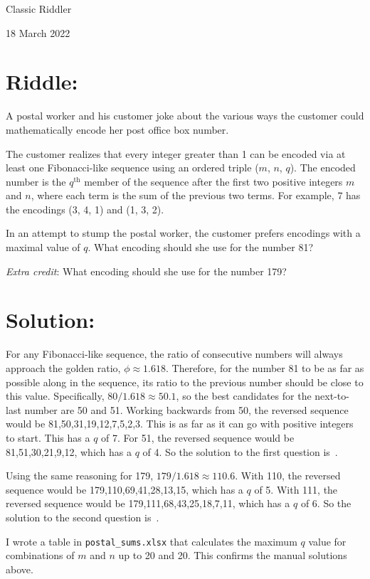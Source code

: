 \documentclass{article}
\begin{document}
\pagestyle{empty} %

\begin{center}
{\LARGE Classic Riddler}

\vspace{0.15in}

{\Large 18 March 2022}
\end{center}


\section*{Riddle:}

A postal worker and his customer joke about the various ways the customer could mathematically encode her post office box number.

The customer realizes that every integer greater than 1 can be encoded via at least one Fibonacci-like sequence using an ordered triple ($m$, $n$, $q$).
The encoded number is the $q^{\mathrm{th}}$ member of the sequence after the first two positive integers $m$ and $n$, where each term is the sum of the previous two terms.
For example, 7 has the encodings (3, 4, 1) and (1, 3, 2).

In an attempt to stump the postal worker, the customer prefers encodings with a maximal value of $q$.
What encoding should she use for the number 81?

\textit{Extra credit}: What encoding should she use for the number 179?


\section*{Solution:}

For any Fibonacci-like sequence, the ratio of consecutive numbers will always approach the golden ratio, $\phi\approx1.618$.
Therefore, for the number 81 to be as far as possible along in the sequence, its ratio to the previous number should be close to this value.
Specifically, $80/1.618\approx50.1$, so the best candidates for the next-to-last number are 50 and 51.
Working backwards from 50, the reversed sequence would be 81,50,31,19,12,7,5,2,3.
This is as far as it can go with positive integers to start.
This has a $q$ of 7.
For 51, the reversed sequence would be 81,51,30,21,9,12, which has a $q$ of 4.
So the solution to the first question is \,.

Using the same reasoning for 179, $179/1.618\approx110.6$.
With 110, the reversed sequence would be 179,110,69,41,28,13,15, which has a $q$ of 5.
With 111, the reversed sequence would be 179,111,68,43,25,18,7,11, which has a $q$ of 6.
So the solution to the second question is \,.

I wrote a table in \texttt{postal\_sums.xlsx} that calculates the maximum $q$ value for combinations of $m$ and $n$ up to 20 and 20.
This confirms the manual solutions above.
\end{document}

